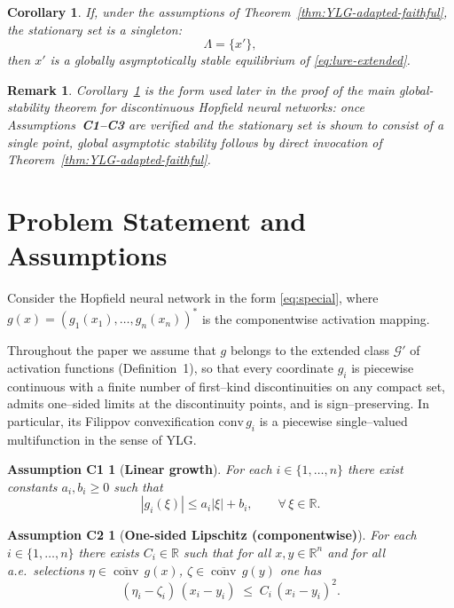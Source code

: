 \documentclass[journal]{IEEEtran}
\theoremstyle{myplain}
\newtheorem{corollary}{Corollary}
\newtheorem{remark}{Remark}
\newtheorem*{assumption1}{Assumption C1}
\newtheorem*{assumption2}{Assumption C2}
\begin{document}
\begin{corollary}
\label{cor:YLG-singleton}
If, under the assumptions of
Theorem~\ref{thm:YLG-adapted-faithful}, the stationary set is a singleton:
\[
  \Lambda=\{x'\},
\]
then \(x'\) is a globally asymptotically stable equilibrium of
\eqref{eq:lure-extended}.
\end{corollary}

\begin{remark}
Corollary~\ref{cor:YLG-singleton} is the form used later in the proof of the
main global-stability theorem for discontinuous Hopfield neural networks:
once Assumptions~\textbf{C1--C3} are verified and the stationary set is shown to consist
of a single point, global asymptotic stability follows by direct invocation of
Theorem~\ref{thm:YLG-adapted-faithful}.
\end{remark}

\section{Problem Statement and Assumptions}\label{sec:problem}

Consider the Hopfield neural network in the form \eqref{eq:special}, where $g(x)=(g_1(x_1),\ldots,g_n(x_n))^*$ is the componentwise activation
mapping.

Throughout the paper we assume that $g$ belongs to the extended class
$\mathcal G'$ of activation functions (Definition~1), so that every
coordinate $g_i$ is piecewise continuous with a finite number of
first–kind discontinuities on any compact set, admits one–sided limits
at the discontinuity points, and is sign–preserving.  In particular, its Filippov convexification
$\mathrm{conv}\,g_i$ is a piecewise single–valued
multifunction in the sense of YLG.

\begin{assumption1}[\bf Linear growth]\label{ass:C1}
For each $i\in\{1,\dots,n\}$ there exist constants $a_i,b_i\ge 0$ such
that
\[
  |g_i(\xi)| \le a_i|\xi| + b_i,
  \qquad \forall\,\xi\in\mathbb{R}.
\]
\end{assumption1}

\begin{assumption2}[\bf One-sided Lipschitz (componentwise)]\label{ass:C2}
For each $i\in\{1,\dots,n\}$ there exists $C_i\in\mathbb{R}$ such that
for all $x,y\in\mathbb{R}^n$ and for all a.e.\ selections
$\eta\in\overline{\operatorname{conv}}\,g(x)$, $\zeta\in\overline{\operatorname{conv}}\,g(y)$ one has
\[
  (\eta_i - \zeta_i)\,(x_i - y_i)
  \;\le\; C_i\,(x_i - y_i)^2.
\]
\end{assumption2}
\end{document}
